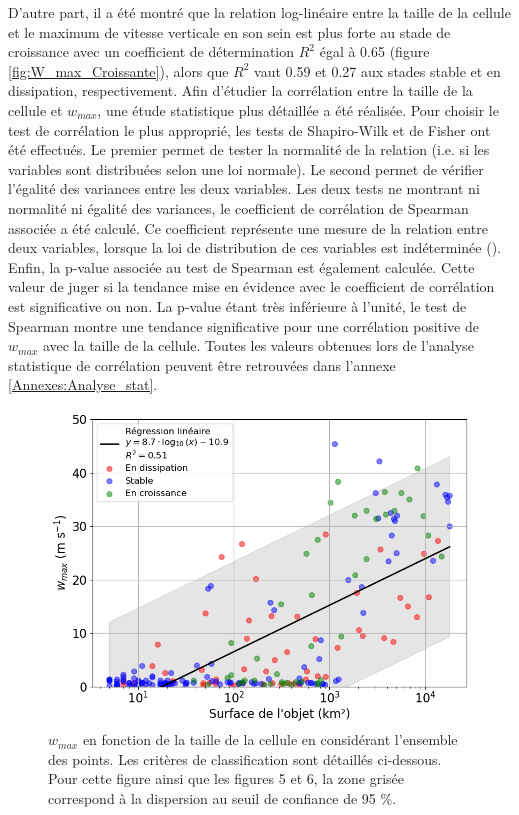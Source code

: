 \documentclass[12pt]{article}
\begin{document}
\begin{multicols}{2}
D'autre part, il a été montré que la relation log-linéaire entre la taille de la cellule et le maximum de vitesse verticale en son sein est plus forte au stade de croissance avec un coefficient de détermination $R^2$ égal à 0.65 (figure \ref{fig:W_max_Croissante}), alors que $R^{2}$ vaut 0.59 et 0.27 aux stades stable et en dissipation, respectivement. Afin d'étudier la corrélation entre la taille de la cellule et $w_{max}$, une étude statistique plus détaillée a été réalisée. Pour choisir le test de corrélation le plus approprié, les tests de Shapiro-Wilk et de Fisher ont été effectués. Le premier permet de tester la normalité de la relation (i.e. si les variables sont distribuées selon une loi normale). Le second permet de vérifier l'égalité des variances entre les deux variables. Les deux tests ne montrant ni normalité ni égalité des variances, le coefficient de corrélation de Spearman associée a été calculé. Ce coefficient représente une mesure de la relation entre deux variables, lorsque la loi de distribution de ces variables est indéterminée (\cite{Spearman}). Enfin, la p-value associée au test de Spearman est également calculée. Cette valeur de juger si la tendance mise en évidence avec le coefficient de corrélation est significative ou non. La p-value étant très inférieure à l'unité, le test de Spearman montre une tendance significative pour une corrélation positive de $w_{max}$ avec la taille de la cellule. Toutes les valeurs obtenues lors de l'analyse statistique de corrélation peuvent être retrouvées dans l'annexe \ref{Annexes:Analyse_stat}.

\vspace{-0.5cm}
\begin{figure}[H]
    \centering
    \includegraphics[width=1\linewidth]{Figures/w_max_vs_size.png}
    \vspace{-1em}
    \caption{$w_{max}$ en fonction de la taille de la cellule en considérant l'ensemble des points. Les critères de classification sont détaillés ci-dessous. Pour cette figure ainsi que les figures 5 et 6, la zone grisée correspond à la dispersion au seuil de confiance de 95 \%.}
    \label{fig:wmax_all}
\end{figure}


\end{multicols}
\end{document}
